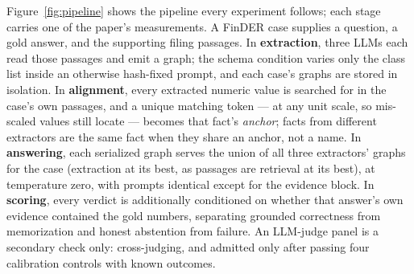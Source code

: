 \documentclass{article}
\begin{document}
Figure~\ref{fig:pipeline} shows the pipeline every experiment follows;
each stage carries one of the paper's measurements. A FinDER case supplies
a question, a gold answer, and the supporting filing passages. In
\textbf{extraction}, three LLMs each read those passages and emit a
graph; the schema condition varies only the class list inside an
otherwise hash-fixed prompt, and each case's graphs are stored in
isolation. In
\textbf{alignment}, every extracted numeric value is searched for in the
case's own passages, and a unique matching token --- at any unit scale,
so mis-scaled values still locate --- becomes that fact's \emph{anchor};
facts from different extractors are the same fact when they share an
anchor, not a name. In \textbf{answering}, each serialized graph serves
the union of all three extractors' graphs for the case (extraction at its
best, as passages are retrieval at its best), at temperature zero, with
prompts identical except for the evidence block. In \textbf{scoring},
every verdict is additionally conditioned on whether that answer's own
evidence contained the gold numbers, separating grounded correctness from
memorization and honest abstention from failure. An LLM-judge panel is a secondary check only: cross-judging, and admitted
only after passing four calibration controls with known outcomes.
\end{document}
